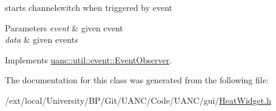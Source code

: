 starts channelswitch when triggered by event 


\begin{DoxyParams}{Parameters}
{\em event} & given event \\
\hline
{\em data} & given events \\
\hline
\end{DoxyParams}


Implements \hyperlink{classuanc_1_1util_1_1event_1_1_event_observer_af1640e34db3379eaba8c817a92199807}{uanc\+::util\+::event\+::\+Event\+Observer}.



The documentation for this class was generated from the following file\+:\begin{DoxyCompactItemize}
\item 
/ext/local/\+University/\+B\+P/\+Git/\+U\+A\+N\+C/\+Code/\+U\+A\+N\+C/gui/\hyperlink{_heat_widget_8h}{Heat\+Widget.\+h}\end{DoxyCompactItemize}
